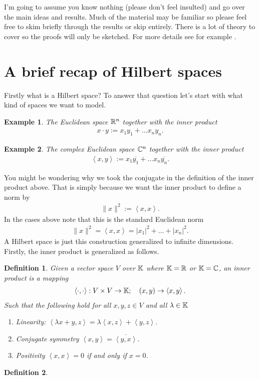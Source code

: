 \documentclass[12pt]{article}
\newtheorem{example}{Example}
\newtheorem{definition}{Definition}
\newcommand{\br}[1]{\left\langle#1\right\rangle} \newcommand{\set}[1]{\left\{#1\right\}}\newcommand{\qt}[1]{\left(#1\right)} \newcommand{\qp}[1]{\left(#1\right)}\newcommand{\qb}[1]{\left[#1\right]}
\renewcommand{\norm}[1]{\lVert #1 \rVert}\renewcommand{\abs}[1]{\left| #1 \right|}
\begin{document}
\begin{CJK*}{UTF8}{gbsn}
	I'm going to assume you know nothing (please don't feel insulted) and go over the main ideas and results.	Much of the material may be familiar so please feel free to skim briefly through the results or skip entirely. There is a lot of theory to cover so the proofs will only be sketched.
	For more details see for example \cite{Bachman2000functional}.     \section{A brief recap of Hilbert spaces}
	Firstly what is a Hilbert space? To answer that question let's start with what kind of spaces we want to model.
	\begin{example}
		The Euclidean space $\mathbb{R}^n$ together with the inner product
		\begin{align*}
			x \cdot y:= x_1 y_1+\ldots x_n y_n.
		\end{align*}
	\end{example}
	\begin{example}
		The complex Euclidean space $\mathbb{C}^n$ together with the inner product
		\begin{align*}
			\br{x,y}:= x_1 \overline{y_1}+\ldots x_n \overline{y_n}.
		\end{align*}
	\end{example}
	You might be wondering why we took the conjugate in the definition of the inner product above. That is simply because we want the inner product to define a norm by
	\begin{align*}
		\norm{x}^2:= \br{x,x}.
	\end{align*}
	In the cases above note that this is the standard Euclidean norm
	\begin{align*}
		\norm{x}^2= \br{x,x}= \abs{x_1} ^2+\ldots +\abs{x_n}^2 .
	\end{align*}
	A Hilbert space is just this construction generalized to infinite dimensions. Firstly, the inner product is generalized as follows.
	\begin{definition}
		Given a vector space $V$ over  $\mathbb{K}$ where $\mathbb{K} =\mathbb{R}$ or $\mathbb{K}=\mathbb{C}$, an inner product is a mapping
		\begin{align*}
			\br{\cdot ,\cdot }: V \times V \to \K; \quad (x,y)\to \br{x,y}.
		\end{align*}
		Such that the following hold for all $x,y,z \in V$ and all $\lambda \in \mathbb{K}$
		\begin{enumerate}
			\item Linearity: $\br{\lambda x+y,z}= \lambda \br{x,z}+ \br{y,z}$.
			\item Conjugate symmetry $\br{x,y}= \overline{\br{y,x}}$.
			\item Positivity $\br{x,x} =0$ if and only if $x=0$.
		\end{enumerate}
	\end{definition}
	\begin{definition}


\end{definition}
\end{CJK*}
\end{document}
